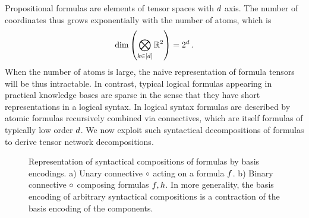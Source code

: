 
Propositional formulas are elements of tensor spaces with $d$ axis.
The number of coordinates thus grows exponentially with the number of atoms, which is
\begin{align*}
    \mathrm{dim}\left(\bigotimes_{k\in[d]}\mathbb{R}^2\right) = 2^{d} \, .
\end{align*}
When the number of atoms is large, the naive representation of formula tensors will be thus intractable.
In contrast, typical logical formulas appearing in practical knowledge bases are sparse in the sense that they have short representations in a logical syntax.
In logical syntax formulas are described by atomic formulas recursively combined via connectives, which are itself formulas of typically low order $d$.
We now exploit such syntactical decompositions of formulas to derive tensor network decompositions.

\begin{figure}[h]
    \begin{center}
        
    \end{center}
    \caption{Representation of syntactical compositions of formulas by basis encodings.
    a) Unary connective $\circ$ acting on a formula $f$.
    b) Binary connective $\circ$ composing formulas $f, h$. %
    In more generality, the basis encoding of arbitrary syntactical compositions is a contraction of the basis encoding of the components.
    }
    \label{fig:unaryBinaryComposition}
\end{figure}

